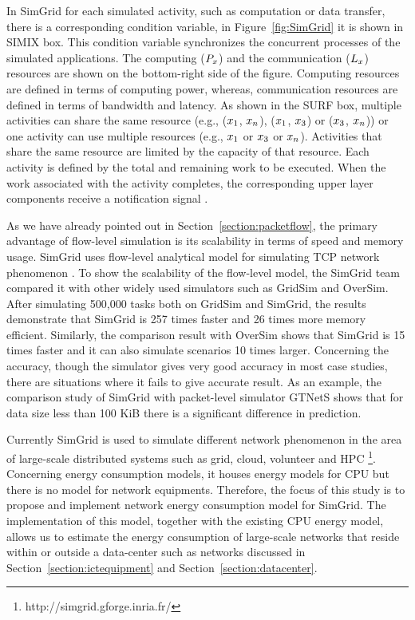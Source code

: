 In SimGrid for each simulated activity, such as computation or data transfer, there is a corresponding condition variable, in Figure~\ref{fig:SimGrid} it is shown in SIMIX box. This condition variable synchronizes the concurrent processes of the simulated applications. The computing (\($$P_{x}$$\)) and the communication (\($$L_{x}$$\)) resources are shown on the bottom-right side of the figure. Computing resources are defined in terms of computing power, whereas, communication resources are defined in terms of bandwidth and latency. As shown in the SURF box, multiple activities can share the same resource (e.g., (\($$x_{1}$$\), \($$x_{n}$$\)), (\($$x_{1}$$\), \($$x_{3}$$\)) or (\($$x_{3}$$\), \($$x_{n}$$\))) or one activity can use multiple resources (e.g., \($$x_{1}$$\) or \($$x_{3}$$\) or  \($$x_{n}$$\)). Activities that share the same resource are limited by the capacity of that resource. Each activity is defined by the total and remaining work to be executed. When the work associated with the activity completes, the corresponding upper layer components receive a notification signal \cite{DBLP:journals/jpdc/CasanovaGLQS14}.

As we have already pointed out in Section~\ref{section:packetflow}, the primary advantage of flow-level simulation is its scalability in terms of speed and memory usage. SimGrid uses flow-level analytical model for simulating TCP network phenomenon \cite{DBLP:journals/jpdc/CasanovaGLQS14}. To show the scalability of the flow-level model, the SimGrid team compared it with other widely used simulators such as GridSim and OverSim. After simulating 500,000 tasks both on GridSim and SimGrid, the results demonstrate that SimGrid is 257 times faster and 26 times more memory efficient. Similarly, the comparison result with OverSim shows that SimGrid is 15 times faster and it can also simulate scenarios 10 times larger. Concerning the accuracy, though the simulator gives very good accuracy in most case studies, there are situations where it fails to give accurate result. As an example, the comparison study of SimGrid with packet-level simulator GTNetS shows that for data size less than 100 KiB there is a significant difference in prediction. 

Currently SimGrid is used to simulate different network phenomenon in the area of large-scale distributed systems such as grid, cloud, volunteer and HPC \footnote{http://simgrid.gforge.inria.fr/}. Concerning energy consumption models, it houses energy models for CPU but there is no model for network equipments. Therefore, the focus of this study is to propose and implement network energy consumption model for SimGrid. The implementation of this model, together with the existing CPU energy model, allows us to estimate the energy consumption of large-scale networks that reside within or outside a data-center such as networks discussed in Section~\ref{section:ictequipment} and Section~\ref{section:datacenter}.

